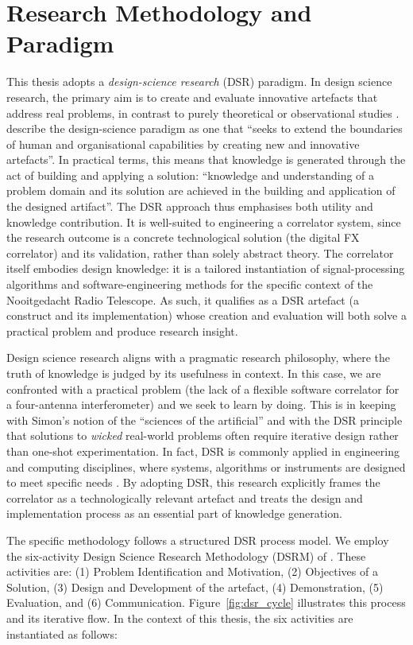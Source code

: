 \section{Research Methodology and Paradigm}
This thesis adopts a \emph{design-science research} (DSR) paradigm. In design science research, the primary aim is to create and evaluate innovative artefacts that address real problems, in contrast to purely theoretical or observational studies \citep{GregorHevner2013}. \citep{Hevner2004} describe the design-science paradigm as one that “seeks to extend the boundaries of human and organisational capabilities by creating new and innovative artefacts”. In practical terms, this means that knowledge is generated through the act of building and applying a solution: “knowledge and understanding of a problem domain and its solution are achieved in the building and application of the designed artifact”. The DSR approach thus emphasises both utility and knowledge contribution. It is well-suited to engineering a correlator system, since the research outcome is a concrete technological solution (the digital FX correlator) and its validation, rather than solely abstract theory. The correlator itself embodies design knowledge: it is a tailored instantiation of signal-processing algorithms and software-engineering methods for the specific context of the Nooitgedacht Radio Telescope. As such, it qualifies as a DSR artefact (a construct and its implementation) whose creation and evaluation will both solve a practical problem and produce research insight.

Design science research aligns with a pragmatic research philosophy, where the truth of knowledge is judged by its usefulness in context. In this case, we are confronted with a practical problem (the lack of a flexible software correlator for a four-antenna interferometer) and we seek to learn by doing. This is in keeping with Simon’s notion of the “sciences of the artificial” and with the DSR principle that solutions to \emph{wicked} real-world problems often require iterative design rather than one-shot experimentation. In fact, DSR is commonly applied in engineering and computing disciplines, where systems, algorithms or instruments are designed to meet specific needs \citep{GregorHevner2013}. By adopting DSR, this research explicitly frames the correlator as a technologically relevant artefact and treats the design and implementation process as an essential part of knowledge generation.

The specific methodology follows a structured DSR process model. We employ the six-activity Design Science Research Methodology (DSRM) of \citep{Peffers2007}. These activities are: (1) Problem Identification and Motivation, (2) Objectives of a Solution, (3) Design and Development of the artefact, (4) Demonstration, (5) Evaluation, and (6) Communication. Figure~\ref{fig:dsr_cycle} illustrates this process and its iterative flow. In the context of this thesis, the six activities are instantiated as follows:

